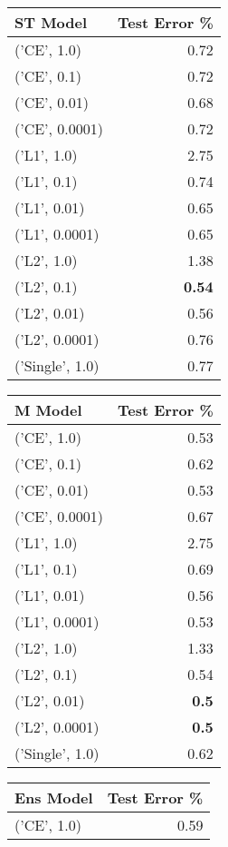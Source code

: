 \begin{tabular}{lr}
\hline
 ST Model        &   Test Error \% \\
\hline
 ('CE', 1.0)     &           0.72 \\
 ('CE', 0.1)     &           0.72 \\
 ('CE', 0.01)    &           0.68 \\
 ('CE', 0.0001)  &           0.72 \\
 ('L1', 1.0)     &           2.75 \\
 ('L1', 0.1)     &           0.74 \\
 ('L1', 0.01)    &           0.65 \\
 ('L1', 0.0001)  &           0.65 \\
 ('L2', 1.0)     &           1.38 \\
 ('L2', 0.1)     &           {\bf 0.54} \\
 ('L2', 0.01)    &           0.56 \\
 ('L2', 0.0001)  &           0.76 \\
 ('Single', 1.0) &           0.77 \\
\hline
\end{tabular}\begin{tabular}{lr}
\hline
 M Model         &   Test Error \% \\
\hline
 ('CE', 1.0)     &           0.53 \\
 ('CE', 0.1)     &           0.62 \\
 ('CE', 0.01)    &           0.53 \\
 ('CE', 0.0001)  &           0.67 \\
 ('L1', 1.0)     &           2.75 \\
 ('L1', 0.1)     &           0.69 \\
 ('L1', 0.01)    &           0.56 \\
 ('L1', 0.0001)  &           0.53 \\
 ('L2', 1.0)     &           1.33 \\
 ('L2', 0.1)     &           0.54 \\
 ('L2', 0.01)    &           {\bf 0.5}  \\
 ('L2', 0.0001)  &           {\bf 0.5}  \\
 ('Single', 1.0) &           0.62 \\
\hline
\end{tabular}\begin{tabular}{lr}
\hline
 Ens Model       &   Test Error \% \\
\hline
 ('CE', 1.0)     &           0.59 \\

\end{tabular}
